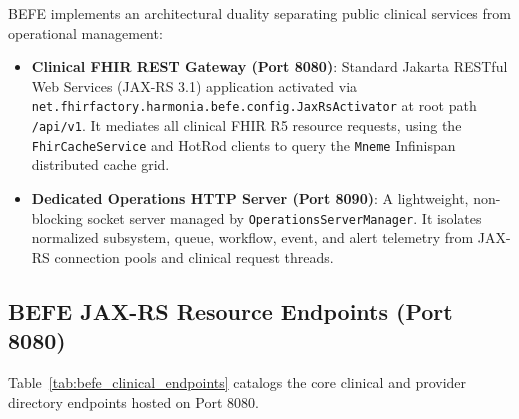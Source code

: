 BEFE implements an architectural duality separating public clinical services from operational management:

\begin{itemize}
    \item \textbf{Clinical FHIR REST Gateway (Port 8080)}: Standard Jakarta RESTful Web Services (JAX-RS 3.1) application activated via \texttt{net.fhirfactory.harmonia.befe.config.JaxRsActivator} at root path \texttt{/api/v1}. It mediates all clinical FHIR R5 resource requests, using the \texttt{FhirCacheService} and HotRod clients to query the \texttt{Mneme} Infinispan distributed cache grid.
    \item \textbf{Dedicated Operations HTTP Server (Port 8090)}: A lightweight, non-blocking socket server managed by \texttt{OperationsServerManager}. It isolates normalized subsystem, queue, workflow, event, and alert telemetry from JAX-RS connection pools and clinical request threads.
\end{itemize}

\subsection{BEFE JAX-RS Resource Endpoints (Port 8080)}

Table~\ref{tab:befe_clinical_endpoints} catalogs the core clinical and provider directory endpoints hosted on Port 8080.


